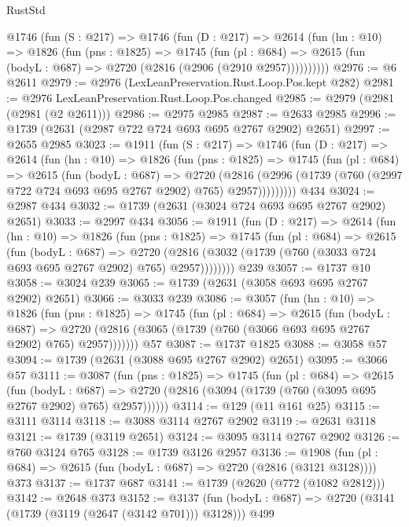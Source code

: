 \begin{lexlean}{RustStd}
\begin{coremodule}
    @1746
      (fun (S : @217) =>
      @1746
        (fun (D : @217) =>
        @2614
          (fun (hn : @10) =>
          @1826
            (fun (pns : @1825) =>
            @1745
              (fun (pl : @684) =>
              @2615 (fun (bodyL : @687) => @2720 (@2816 (@2906 (@2910 @2957))))))))))
@2976 := @6 @2611
@2979 := @2976 (LexLeanPreservation.Rust.Loop.Pos.kept @282)
@2981 := @2976 LexLeanPreservation.Rust.Loop.Pos.changed
@2985 := @2979 (@2981 (@2981 (@2 @2611)))
@2986 := @2975 @2985
@2987 := @2633 @2985
@2996 := @1739 (@2631 (@2987 @722 @724 @693 @695 @2767 @2902) @2651)
@2997 := @2655 @2985
@3023 := @1911
    (fun (S : @217) =>
    @1746
      (fun (D : @217) =>
      @2614
        (fun (hn : @10) =>
        @1826
          (fun (pns : @1825) =>
          @1745
            (fun (pl : @684) =>
            @2615
              (fun (bodyL : @687) =>
              @2720
                (@2816
                  (@2996 (@1739 (@760 (@2997 @722 @724 @693 @695 @2767 @2902) @765) @2957)))))))))
    @434
@3024 := @2987 @434
@3032 := @1739 (@2631 (@3024 @724 @693 @695 @2767 @2902) @2651)
@3033 := @2997 @434
@3056 := @1911
    (fun (D : @217) =>
    @2614
      (fun (hn : @10) =>
      @1826
        (fun (pns : @1825) =>
        @1745
          (fun (pl : @684) =>
          @2615
            (fun (bodyL : @687) =>
            @2720 (@2816 (@3032 (@1739 (@760 (@3033 @724 @693 @695 @2767 @2902) @765) @2957))))))))
    @239
@3057 := @1737 @10
@3058 := @3024 @239
@3065 := @1739 (@2631 (@3058 @693 @695 @2767 @2902) @2651)
@3066 := @3033 @239
@3086 := @3057
    (fun (hn : @10) =>
    @1826
      (fun (pns : @1825) =>
      @1745
        (fun (pl : @684) =>
        @2615
          (fun (bodyL : @687) =>
          @2720 (@2816 (@3065 (@1739 (@760 (@3066 @693 @695 @2767 @2902) @765) @2957)))))))
    @57
@3087 := @1737 @1825
@3088 := @3058 @57
@3094 := @1739 (@2631 (@3088 @695 @2767 @2902) @2651)
@3095 := @3066 @57
@3111 := @3087
    (fun (pns : @1825) =>
    @1745
      (fun (pl : @684) =>
      @2615
        (fun (bodyL : @687) =>
        @2720 (@2816 (@3094 (@1739 (@760 (@3095 @695 @2767 @2902) @765) @2957))))))
@3114 := @129 (@11 @161 @25)
@3115 := @3111 @3114
@3118 := @3088 @3114 @2767 @2902
@3119 := @2631 @3118
@3121 := @1739 (@3119 @2651)
@3124 := @3095 @3114 @2767 @2902
@3126 := @760 @3124 @765
@3128 := @1739 @3126 @2957
@3136 := @1908 (fun (pl : @684) => @2615 (fun (bodyL : @687) => @2720 (@2816 (@3121 @3128)))) @373
@3137 := @1737 @687
@3141 := @1739 (@2620 (@772 (@1082 @2812)))
@3142 := @2648 @373
@3152 := @3137 (fun (bodyL : @687) => @2720 (@3141 (@1739 (@3119 (@2647 (@3142 @701))) @3128))) @499

\end{coremodule}
\end{lexlean}
